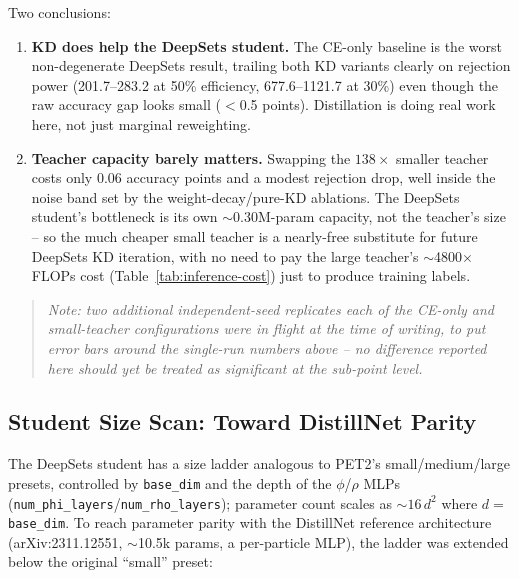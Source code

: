 Two conclusions:
\begin{enumerate}
    \item \textbf{KD does help the DeepSets student.} The CE-only baseline is
    the worst non-degenerate DeepSets result, trailing both KD variants
    clearly on rejection power (201.7--283.2 at 50\% efficiency,
    677.6--1121.7 at 30\%) even though the raw accuracy gap looks small
    ($<$0.5 points). Distillation is doing real work here, not just
    marginal reweighting.
    \item \textbf{Teacher capacity barely matters.} Swapping the $138\times$
    smaller teacher costs only 0.06 accuracy points and a modest rejection
    drop, well inside the noise band set by the weight-decay/pure-KD
    ablations. The DeepSets student's bottleneck is its own $\sim$0.30M-param
    capacity, not the teacher's size -- so the much cheaper small teacher is
    a nearly-free substitute for future DeepSets KD iteration, with no need
    to pay the large teacher's $\sim$4800$\times$ FLOPs cost
    (Table~\ref{tab:inference-cost}) just to produce training labels.
\end{enumerate}

\begin{quote}
\emph{Note: two additional independent-seed replicates each of the CE-only
and small-teacher configurations were in flight at the time of writing, to
put error bars around the single-run numbers above -- no difference reported
here should yet be treated as significant at the sub-point level.}
\end{quote}

\subsection{Student Size Scan: Toward DistillNet Parity}
\label{sec:deepsets-size-scan}

The DeepSets student has a size ladder analogous to PET2's small/medium/large
presets, controlled by \texttt{base\_dim} and the depth of the $\phi$/$\rho$
MLPs (\texttt{num\_phi\_layers}/\texttt{num\_rho\_layers}); parameter count
scales as $\sim 16\,d^2$ where $d=$\texttt{base\_dim}. To reach parameter
parity with the DistillNet reference architecture (arXiv:2311.12551,
$\sim$10.5k params, a per-particle MLP), the ladder was extended below the
original ``small'' preset:

